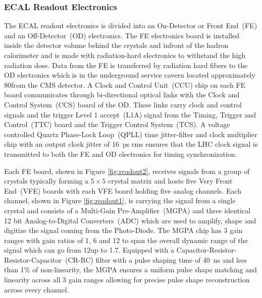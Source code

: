 \subsubsection{ECAL Readout Electronics}\label{ecalreadout}
The ECAL readout electronics is divided into an On-Detector or Front End~(FE) and an Off-Detector~(OD) electronics. The FE electronics board is installed inside the detector volume behind the crystals and infront of the hadron calorimeter and is made with radiation-hard electronics to withstand the high radiation dose. Data from the FE is transferred by radiation hard fibers to the OD electronics which is in the underground service cavern located approximately 80\m from the CMS detector. 
\newline
A Clock and Control Unit~(CCU) chip on each FE board communicates through bi-directional optical links with the Clock and Control System~(CCS) board of the OD. These links carry clock and control  signals and the trigger Level 1 accept~(L1A) signal from the Timing, Trigger and Control~(TTC) board and the Trigger Control System~(TCS). A voltage controlled Quartz Phase-Lock Loop~(QPLL) time jitter-filter and clock multiplier chip  with an output clock jitter of 16~ps rms ensures that the LHC clock signal is transmitted to both the FE and OD electronics for timing synchronization.
\par
Each FE board, shown in Figure \ref{fig:readout2}, receives signals from a group of crystals typically forming a $5\times5$ crystal matrix and hosts five Very Front End~(VFE) boards with each VFE board holding five analog channels. Each channel, shown in Figure \ref{fig:readout1}, is carrying the signal from a single crystal and consists of a Multi-Gain Pre-Amplifier~(MGPA) and three identical 12 bit Analog-to-Digital Converters~(ADC) which are used to amplify, shape and digitize the signal coming from the Photo-Diode.
\newline
The MGPA chip has 3 gain ranges with gain ratios of 1, 6 and 12 to span the overall dynamic range of the signal which can go from 12\MeV up to 1.7\TeV. Equipped with a Capacitor-Resistor-Resistor-Capacitor~(CR-RC) filter with a pulse shaping time of 40~ns and less than 1\% of non-linearity, the MGPA ensures a uniform pulse shape matching and linearity across all 3 gain ranges allowing for precise pulse shape reconstruction across every channel.
